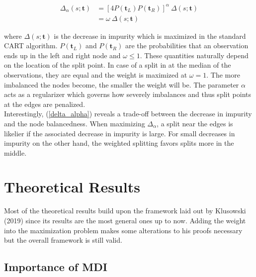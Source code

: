 \documentclass{article}
\begin{document}
\begin{align}
    \Delta_{\alpha}(s; \mathbf{t}) &= [4 P(\mathbf{t}_L) P(\mathbf{t}_R)]^{\alpha} \ \Delta (s; \mathbf{t}) \label{delta_alpha} \\
    &= \omega \ \Delta (s; \mathbf{t}) \nonumber
\end{align}

where $\Delta (s; \mathbf{t})$ is the decrease in impurity which is maximized in the standard CART algorithm. $P(\mathbf{t}_L)$ and $P(\mathbf{t}_R)$ are the probabilities that an observation ends up in the left and right node and $\omega \leq 1$. These quantities naturally depend on the location of the split point. In case of a split in at the median of the observations, they are equal and the weight is maximized at $\omega = 1$. The more imbalanced the nodes become, the smaller the weight will be. The parameter $\alpha$ acts as a regularizer which governs how severely imbalances and thus split points at the edges are penalized. \\
Interestingly, (\ref{delta_alpha}) reveals a trade-off between the decrease in impurity and the node balancedness. When maximizing $\Delta_{\alpha}$, a split near the edges is likelier if the associated decrease in impurity is large. For small decreases in impurity on the other hand, the weighted splitting favors splits more in the middle.


\section{Theoretical Results}

Most of the theoretical results build upon the framework laid out by Klusowski (2019) since its results are the most general ones up to now. Adding the weight into the maximization problem makes some alterations to his proofs necessary but the overall framework is still valid.

\subsection{Importance of MDI}



\newpage
\nocite{*}
\begin{singlespace}
  

\end{singlespace}
\end{document}
